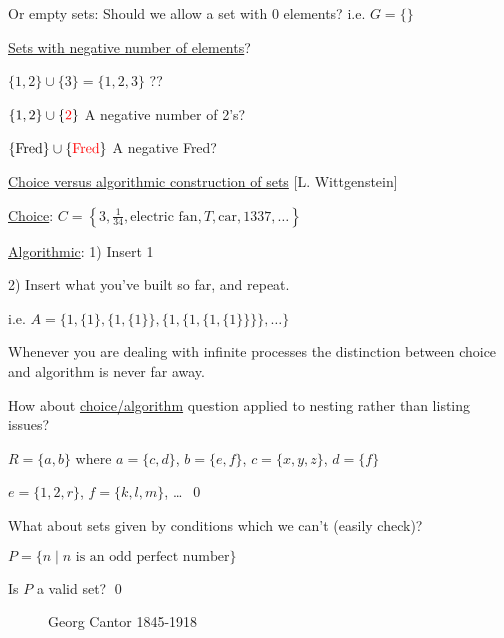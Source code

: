 {Or empty sets: Should we allow a set with 0 elements? i.e. \( G = \{\} \)

\vspace{1em}  %

\underline{Sets with negative number of elements}?

\( \{1,2\} \cup \{3\} = \{1,2,3\} \) ??

\( \{1,2\} \cup \{\textcolor{red}{2}\} \) A negative number of 2's?

\( \{ \text{Fred} \} \cup \{\textcolor{red}{\text{Fred}}\} \) A negative Fred?

\vspace{1em}  %
\underline{Choice versus algorithmic construction of sets} [L. Wittgenstein]

\vspace{1em}  %

\underline{Choice}:
\( C = \left\{3, \frac{1}{34}, \text{electric fan}, T, \text{car}, 1337, \ldots \right\} \)

\vspace{1em}  %

\underline{Algorithmic}: 1) Insert 1

2) Insert what you've built so far, and repeat.

i.e. \( A = \{1, \{1\}, \{1,\{1\}\}, \{1,\{1,\{1,\{1\}\}\}\}, \ldots \} \)

\vspace{1em}  %

Whenever you are dealing with infinite processes the distinction between choice and algorithm is never far away.

How about \underline{choice/algorithm} question applied to nesting rather than listing issues?

\eg \( R = \{a, b\} \) where \( a = \{c, d\} \), \( b = \{ e, f\} \), \( c = \{ x, y , z\} \), \( d = \{f\} \)

\( e = \{1, 2, r\} \), \( f = \{k, l, m\} \), \ldots ~\qed

What about sets given by conditions which we can't (easily check)?

\eg \( P = \{ n \mid n \text{ is an odd perfect number} \} \)

Is \( P \) a valid set? \qed

\begin{figure}[ht]
    \centering
    \caption{Georg Cantor 1845-1918}
    \label{fig:george-cantor}
\end{figure}

}

